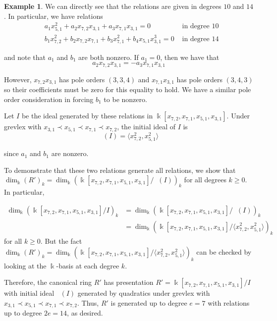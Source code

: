 \documentclass{amsart}
\theoremstyle{plain}
\theoremstyle{definition}
\newtheorem{example}[thm]{Example}
\theoremstyle{remark}
\numberwithin{equation}{section}
\newcommand\Bk{{\Bbbk}}
\DeclareMathOperator{\initial}{in_\prec}
\begin{document}
\begin{example}
We can directly see that the relations are given in degrees $10$
and $14$. In particular, we have relations
\begin{align*}
	&a_1 x_{5, 1}^2 + a_2 x_{7, 2} x_{3, 1} + a_3 x_{7, 1} x_{3, 1} = 
	0 &\text{ in degree $10$} \\
	&b_1 x_{7, 2}^2 + b_2 x_{7, 2} x_{7, 1} + b_3 x_{7, 1}^2
	+ b_4 x_{5, 1} x_{3, 1}^3 = 0  &\text{ in degree $14$}
\end{align*}

\noindent
and note that $a_1$ and $b_1$ are both nonzero. If $a_1 = 0$, then we
have that
\[
	a_2 x_{7, 2} x_{3, 1} = -a_3 x_{7, 1} x_{3, 1}
\]

\noindent
However, $x_{7, 2} x_{3, 1}$ has pole orders $(3, 3, 4)$ and
$x_{7, 1} x_{3, 1}$ has pole orders $(3, 4, 3)$ so their
coefficients must be zero for this equality to hold. We have a
similar pole order consideration in forcing $b_1$ to be nonzero.

Let $I$ be the ideal generated by these relations in
$\Bk[x_{7, 2}, x_{7, 1}, x_{5, 1}, x_{3, 1}]$. Under grevlex with
$x_{3,1} \prec x_{5,1} \prec x_{7,1} \prec x_{7,2}$, the initial
ideal of $I$ is
\[
	\initial(I) = \langle x_{7, 2}^2, x_{5, 1}^2 \rangle
\]

\noindent
since $a_1$ and $b_1$ are nonzero.

To demonstrate that these two relations generate all 
relations, we show that $\dim_\Bk (R')_k = \dim_\Bk
(\Bk[x_{7, 2}, x_{7, 1}, x_{5, 1}, x_{3, 1}] / \initial(I))_k$ for 
all degrees $k \geq 0$. In particular, 

\begin{align*}
	\dim_\Bk \left(\Bk[x_{7, 2}, x_{7, 1}, x_{5, 1}, x_{3, 1}] / I\right)_k &=
	\dim_\Bk \left(\Bk[x_{7, 2}, x_{7, 1}, x_{5, 1}, x_{3, 1}]	/ \initial(I)\right)_k \\
	&= \dim_\Bk \left(\Bk[x_{7, 2}, x_{7, 1}, x_{5, 1}, x_{3, 1}] / \langle
	x_{7, 2}^2, x_{5, 1}^2 \rangle \right)_k
\end{align*}
\noindent
for all $k \geq 0$. But the fact $\dim_\Bk (R')_k = \dim_\Bk \left(\Bk[x_{7, 2},
x_{7, 1}, x_{5, 1}, x_{3, 1}] / \langle x_{7, 2}^2, x_{5, 1}^2
\rangle\right)_k$ can be checked by looking at the $\Bk$-basis at each degree
$k$.

Therefore, the canonical ring $R'$ has presentation $R' =
\Bk[x_{7, 2}, x_{7, 1}, x_{5, 1}, x_{3, 1}] / I$ with
initial ideal $\initial(I)$ generated by quadratics under grevlex
with $x_{3,1} \prec x_{5,1} \prec x_{7,1} \prec x_{7,2}$.
Thus, $R'$ is generated up to degree $e = 7$ with relations up to
degree $2e = 14$, as desired.
\end{example}
\end{document}
